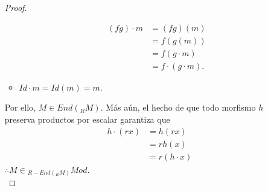 \documentclass{article}
\newcommand{\lrprth}[1]{
	\left(#1\right)
}
\theoremstyle{definition}
\theoremstyle{plain}
\theoremstyle{plain}
\theoremstyle{definition}
\theoremstyle{definition}
\theoremstyle{definition}
\theoremstyle{definition}
\theoremstyle{definition}
\theoremstyle{definition}
\begin{document}
\begin{enumerate}[label=\textbf{Ej \arabic*.}]
\begin{proof}
\begin{itemize}
		\begin{align*}
			\lrprth{fg} \cdot m&=\lrprth{fg}\lrprth{m}\\
			&=f\lrprth{g\lrprth{m}}\\
			&=f\lrprth{g \cdot m}\\
			&=f \cdot \lrprth{g \cdot m}.
		\end{align*}
		\item $Id \cdot m=Id\lrprth{m}=m$.
	\end{itemize}
	Por ello, $M \in End\lrprth{_{R}M}$. Más aún, el hecho de que todo morfismo $h$ preserva productos por escalar garantiza que
	\begin{align*}
		h \cdot \lrprth{rx}&=h\lrprth{rx}\\
		&=rh\lrprth{x}\\
		&=r\lrprth{h \cdot x}
	\end{align*}
	$\therefore M \in {}_{R-End\lrprth{_{R}M}}Mod$.\\
	

\end{proof}
\end{enumerate}
\end{document}
